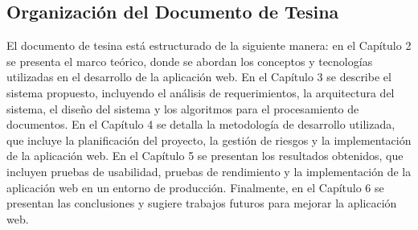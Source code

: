 \subsection{Organización del Documento de Tesina}
El documento de tesina está estructurado de la siguiente manera: en el Capítulo 2 se presenta el marco teórico, donde se abordan los conceptos y tecnologías utilizadas en el desarrollo de la aplicación web. En el Capítulo 3 se describe el sistema propuesto, incluyendo el análisis de requerimientos, la arquitectura del sistema, el diseño del sistema y los algoritmos para el procesamiento de documentos. En el Capítulo 4 se detalla la metodología de desarrollo utilizada, que incluye la planificación del proyecto, la gestión de riesgos y la implementación de la aplicación web. En el Capítulo 5 se presentan los resultados obtenidos, que incluyen pruebas de usabilidad, pruebas de rendimiento y la implementación de la aplicación web en un entorno de producción. Finalmente, en el Capítulo 6 se presentan las conclusiones y sugiere trabajos futuros para mejorar la aplicación web.